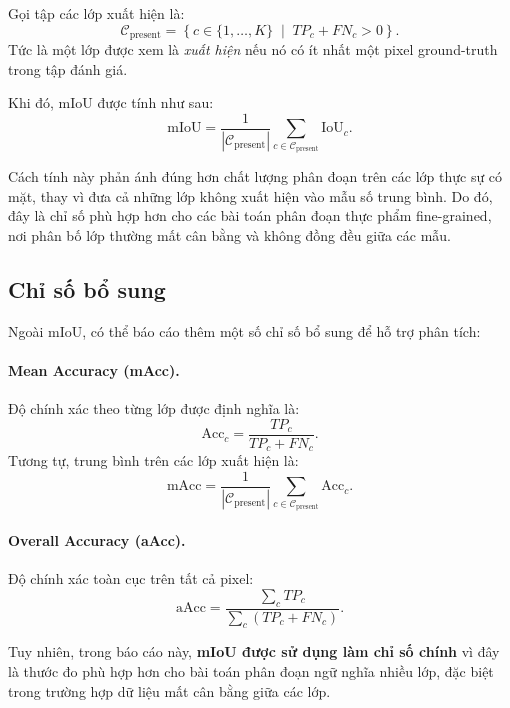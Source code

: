 Gọi tập các lớp xuất hiện là:
\[
\mathcal{C}_{\mathrm{present}}
=
\left\{
c \in \{1,\dots,K\}
\;\middle|\;
TP_c + FN_c > 0
\right\}.
\]
Tức là một lớp được xem là \textit{xuất hiện} nếu nó có ít nhất một pixel ground-truth trong tập đánh giá.

Khi đó, mIoU được tính như sau:
\[
\mathrm{mIoU}
=
\frac{1}{|\mathcal{C}_{\mathrm{present}}|}
\sum_{c \in \mathcal{C}_{\mathrm{present}}}
\mathrm{IoU}_c.
\]

Cách tính này phản ánh đúng hơn chất lượng phân đoạn trên các lớp thực sự có mặt, thay vì đưa cả những lớp không xuất hiện vào mẫu số trung bình. Do đó, đây là chỉ số phù hợp hơn cho các bài toán phân đoạn thực phẩm fine-grained, nơi phân bố lớp thường mất cân bằng và không đồng đều giữa các mẫu.

\subsection{Chỉ số bổ sung}

Ngoài mIoU, có thể báo cáo thêm một số chỉ số bổ sung để hỗ trợ phân tích:

\paragraph{Mean Accuracy (mAcc).}
Độ chính xác theo từng lớp được định nghĩa là:
\[
\mathrm{Acc}_c = \frac{TP_c}{TP_c + FN_c}.
\]
Tương tự, trung bình trên các lớp xuất hiện là:
\[
\mathrm{mAcc}
=
\frac{1}{|\mathcal{C}_{\mathrm{present}}|}
\sum_{c \in \mathcal{C}_{\mathrm{present}}}
\mathrm{Acc}_c.
\]

\paragraph{Overall Accuracy (aAcc).}
Độ chính xác toàn cục trên tất cả pixel:
\[
\mathrm{aAcc}
=
\frac{\sum_{c} TP_c}{\sum_{c}(TP_c + FN_c)}.
\]

Tuy nhiên, trong báo cáo này, \textbf{mIoU được sử dụng làm chỉ số chính} vì đây là thước đo phù hợp hơn cho bài toán phân đoạn ngữ nghĩa nhiều lớp, đặc biệt trong trường hợp dữ liệu mất cân bằng giữa các lớp.